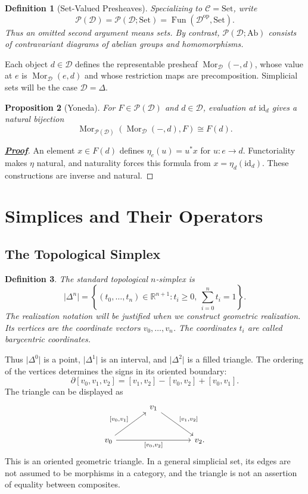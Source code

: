 \documentclass[11pt]{article}
\newcommand{\proofdest}{}
\newcommand{\claim}[1]{\def\proofdest{proof:#1}\hypertarget{statement:#1}{}}
\theoremstyle{linked}
\newtheorem{proposition}{Proposition}[section]
\theoremstyle{plainlecture}
\newtheorem{definition}[proposition]{Definition}
\newenvironment{linkedproof}[1]{\hypertarget{proof:#1}{}\begin{proof}[\normalfont\bfseries\hyperlink{statement:#1}{Proof}]}{\end{proof}}
\newcommand{\Mor}{\operatorname{Mor}}
\newcommand{\PSh}{\mathcal{P}}
\newcommand{\Fun}{\operatorname{Fun}}
\newcommand{\id}{\mathrm{id}}
\newcommand{\Set}{\mathrm{Set}}
\newcommand{\Ab}{\mathrm{Ab}}
\begin{document}
\begin{definition}[Set-Valued Presheaves]
Specializing to $\mathcal C=\Set$, write
\[
\PSh(\mathcal D)=\PSh(\mathcal D;\Set)
=\Fun(\mathcal D^{\mathrm{op}},\Set).
\]
Thus an omitted second argument means sets. By contrast, $\PSh(\mathcal D;\Ab)$ consists of contravariant diagrams of abelian groups and homomorphisms.
\end{definition}
Each object $d\in\mathcal D$ defines the representable presheaf $\Mor_{\mathcal D}(-,d)$, whose value at $e$ is $\Mor_{\mathcal D}(e,d)$ and whose restriction maps are precomposition. Simplicial sets will be the case $\mathcal D=\Delta$.

\claim{presheaf-yoneda}
\begin{proposition}[Yoneda]
For $F\in\PSh(\mathcal D)$ and $d\in\mathcal D$, evaluation at $\id_d$ gives a natural bijection
\[
\Mor_{\PSh(\mathcal D)}(\Mor_{\mathcal D}(-,d),F)\cong F(d).
\]
\end{proposition}
\begin{linkedproof}{presheaf-yoneda}
An element $x\in F(d)$ defines $\eta_e(u)=u^*x$ for $u:e\to d$. Functoriality makes $\eta$ natural, and naturality forces this formula from $x=\eta_d(\id_d)$. These constructions are inverse and natural.
\end{linkedproof}

\section{Simplices and Their Operators}\label{sec:simplices}
\subsection{The Topological Simplex}
\begin{definition}
The standard topological $n$-simplex is
\[
\lvert\Delta^{n}\rvert=\left\{(t_0,\ldots,t_n)\in\mathbb R^{n+1}:
t_i\geq0,\ \sum_{i=0}^n t_i=1\right\}.
\]
The realization notation will be justified when we construct geometric realization. Its vertices are the coordinate vectors $v_0,\ldots,v_n$. The coordinates $t_i$ are called barycentric coordinates.
\end{definition}
Thus $\lvert\Delta^{0}\rvert$ is a point, $\lvert\Delta^{1}\rvert$ is an interval, and $\lvert\Delta^{2}\rvert$ is a filled triangle. The ordering of the vertices determines the signs in its oriented boundary:
\[
\partial[v_0,v_1,v_2]=[v_1,v_2]-[v_0,v_2]+[v_0,v_1].
\]
The triangle can be displayed as
\[
\begin{tikzcd}[column sep=large,row sep=large]
& v_1 \arrow[dr,"{[v_1,v_2]}"] & \\
v_0 \arrow[ur,"{[v_0,v_1]}"] \arrow[rr,"{[v_0,v_2]}"'] && v_2.
\end{tikzcd}
\]
This is an oriented geometric triangle. In a general simplicial set, its edges are not assumed to be morphisms in a category, and the triangle is not an assertion of equality between composites.
\end{document}
